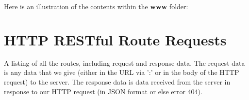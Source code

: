 \noindent Here is an illustration of the contents within the \textbf{www} folder:
\begin{center}
\end{center}

\section{HTTP RESTful Route Requests}
A listing of all the routes, including request and response data.
The request data is any data that we give (either in the URL via ':' or in the body of the HTTP request) to the server.
The response data is data received from the server in response to our HTTP request (in JSON format or else error 404).
\\

